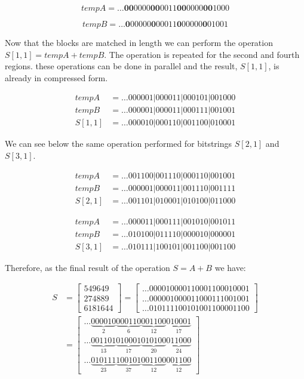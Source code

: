 \documentclass[12pt]{article}
\begin{document}
\begin{equation}\label{eq:12}
tempA =  \ldots\textbf{00}0000\textbf{00}0011\textbf{00}0000\textbf{00}1000
\end{equation}

\begin{equation}\label{eq:13}
tempB =  \ldots\textbf{0}00000\textbf{0}00011\textbf{0}00000\textbf{0}01001
\end{equation}

Now that the blocks are matched in length we can perform the operation $S[1,1] =
tempA + tempB$. The operation is repeated for the second and fourth regions.
these operations can be done in parallel and the result, $S[1,1]$, is already
in compressed form.

\begin{align*}
 tempA&= \ldots000001|000011|000101|001000\\
 tempB&= \ldots000001|000011|000111|001001\\
 S[1,1]&=\ldots000010|000110|001100|010001
\end{align*}

We can see below the same operation performed for bitstrings $S[2,1]$ and
$S[3,1]$.

\begin{align*}
 tempA&= \ldots001100|001110|000110|001001\\
 tempB&= \ldots000001|000011|001110|001111\\
 S[2,1]&=\ldots001101|010001|010100|011000
\end{align*}

\begin{align*}
 tempA&= \ldots000011|000111|001010|001011 \\
 tempB&= \ldots010100|011110|000010|000001 \\
 S[3,1]&=\ldots010111|100101|001100|001100
\end{align*}

Therefore, as the final result of the operation $S= A +
B$ we have:

\begin{align}
	S &= \begin{bmatrix}
			549649\\ 
			274889\\ 
			6181644
		\end{bmatrix}
        =
         \begin{bmatrix}
			\ldots000010000110001100010001\\
			\ldots000001000011000111001001\\
			\ldots010111100101001100001100
		\end{bmatrix}
      \\ \nonumber
      &= \begin{bmatrix}
\ldots\underbrace{000010}_{2}\underbrace{000110}_{6}\underbrace{001100}_{12}
\underbrace{010001}_{17}\\	
 \ldots\underbrace{001101}_{13}\underbrace{010001}_{17}\underbrace{010100}_{20}
\underbrace{011000}_{24}\\
 \ldots\underbrace{010111}_{23}\underbrace{100101}_{37}\underbrace{001100}_{12}
\underbrace{001100}_{12}
		\end{bmatrix}
\end{align}
\end{document}
